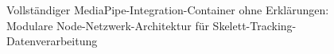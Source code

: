 \begin{figure}[htbp]
    \centering
    \caption{Vollständiger MediaPipe-Integration-Container ohne Erklärungen: Modulare Node-Netzwerk-Architektur für Skelett-Tracking-Datenverarbeitung}
    \label{fig:mediapipe_container_komplett}
\end{figure}
